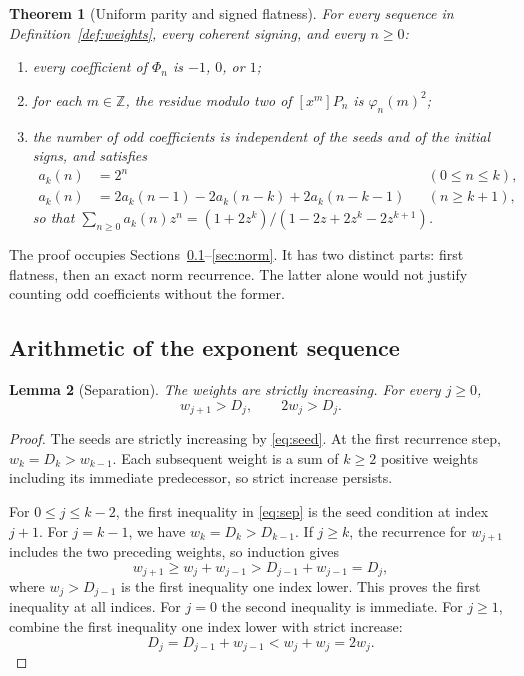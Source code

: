 \documentclass[11pt,letterpaper]{article}
\numberwithin{equation}{section}
\newtheorem{theorem}{Theorem}[section]
\newtheorem{lemma}[theorem]{Lemma}
\theoremstyle{definition}
\theoremstyle{remark}
\newcommand{\Z}{\mathbb Z}
\newcommand{\coef}[2]{[x^{#1}]#2}
\begin{document}
\begin{theorem}[Uniform parity and signed flatness]
\label{thm:flat}
For every sequence in Definition~\ref{def:weights}, every coherent signing,
and every $n\ge0$:
\begin{enumerate}[label=(\roman*)]
\item every coefficient of $\Phi_n$ is $-1$, $0$, or $1$;
\item for each $m\in\Z$, the residue modulo two of $\coef{m}{P_n}$ is
$\varphi_n(m)^2$;
\item the number of odd coefficients is independent of the seeds and of the
initial signs, and satisfies
\begin{align}
 a_k(n)&=2^n &&(0\le n\le k),\label{eq:hinit}\\
 a_k(n)&=2a_k(n-1)-2a_k(n-k)+2a_k(n-k-1) &&(n\ge k+1),\label{eq:hrec}
\end{align}
so that $\sum_{n\ge0}a_k(n)z^n=(1+2z^k)/(1-2z+2z^k-2z^{k+1})$.
\end{enumerate}
\end{theorem}

The proof occupies Sections~\ref{sec:sep}--\ref{sec:norm}. It has two
distinct parts: first flatness, then an exact norm recurrence. The latter
alone would not justify counting odd coefficients without the former.

\subsection{Arithmetic of the exponent sequence}
\label{sec:sep}

\begin{lemma}[Separation]
\label{lem:sep}
The weights are strictly increasing. For every $j\ge0$,
\begin{equation}
 w_{j+1}>D_j,\qquad 2w_j>D_j.
 \label{eq:sep}
\end{equation}
\end{lemma}
\begin{proof}
The seeds are strictly increasing by \eqref{eq:seed}. At the first
recurrence step, $w_k=D_k>w_{k-1}$. Each subsequent weight is a sum of
$k\ge2$ positive weights including its immediate predecessor, so strict
increase persists.

For $0\le j\le k-2$, the first inequality in \eqref{eq:sep} is the seed
condition at index $j+1$. For $j=k-1$, we have $w_k=D_k>D_{k-1}$. If
$j\ge k$, the recurrence for $w_{j+1}$ includes the two preceding weights,
so induction gives
\[
 w_{j+1}\ge w_j+w_{j-1}>D_{j-1}+w_{j-1}=D_j ,
\]
where $w_j>D_{j-1}$ is the first inequality one index lower. This proves the
first inequality at all indices. For $j=0$ the second inequality is
immediate. For $j\ge1$, combine the first inequality one index lower with
strict increase:
\[
 D_j=D_{j-1}+w_{j-1}<w_j+w_j=2w_j .
\]
\end{proof}
\end{document}
